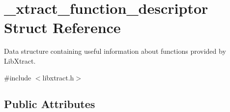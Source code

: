 \hypertarget{struct__xtract__function__descriptor}{\section{\-\_\-xtract\-\_\-function\-\_\-descriptor Struct Reference}
\label{struct__xtract__function__descriptor}
}


Data structure containing useful information about functions provided by Lib\-Xtract.  




{\ttfamily \#include $<$libxtract.\-h$>$}

\subsection*{Public Attributes}
